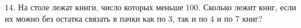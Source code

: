 14. На столе лежат книги, число которых меньше 100. Сколько лежит книг, если их можно без остатка связать в пачки как по 3, так и по 4 и по 7 книг?\\
